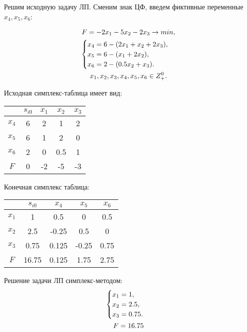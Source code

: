 \documentclass[12pt,a4paper,oneside]{extarticle}
\begin{document}
    Решим исходную задачу ЛП. Сменим знак ЦФ, введем фиктивные переменные $x_4, x_5, x_6$:

    \begin{gather}
        F = -2x_1-5x_2-2x_3 \rightarrow min,  \notag  \\
        \begin{cases}
            x_4 = 6 - (2x_1 + x_2 + 2x_3), \\
            x_5 = 6 - (x_1 + 2x_2),\\
            x_6 = 2 - (0.5x_2 + x_3).
        \end{cases} 
        \notag \\
        x_1, x_2, x_3, x_4, x_5, x_6 \in Z^0_+. \notag
    \end{gather}

    Исходная симплекс-таблица имеет вид:
    \begin{center}
        \begin{tabular}{|c|c|c|c|c|}
            \hline
                 & $s_{i0}$ & $x_1$ & $x_2$ & $x_3$ \\ \hline
            $x_4$ & 6       & 2     & 1     & 2 \\ \hline
            $x_5$ & 6       & 1     & 2     & 0 \\ \hline
            $x_6$ & 2       & 0     & 0.5   & 1 \\ \hline
            $F$   & 0       & -2    & -5    & -3 \\ \hline
        \end{tabular}
    \end{center}

    Конечная симплекс таблица:     
    \begin{center}
        \begin{tabular}{|c|c|c|c|c|}
            \hline
                 & $s_{i0}$ & $x_4$   & $x_5$   & $x_6$ \\ \hline
            $x_1$ & 1       & 0.5     & 0       & 0.5     \\ \hline
            $x_2$ & 2.5     & -0.25   & 0.5     & 0     \\ \hline
            $x_3$ & 0.75    & 0.125   & -0.25   & 0.75  \\ \hline
            $F$   & 16.75   & 0.125   & 1.75    & 2.75  \\ \hline
        \end{tabular}
    \end{center}

    Решение задачи ЛП симплекс-методом:
    \begin{gather}
        \begin{cases}
            x_1 = 1,\\
            x_2 = 2.5, \\
            x_3 = 0.75. \\
        \end{cases} \notag \\
        F = 16.75 \notag 
    \end{gather}
\end{document}
